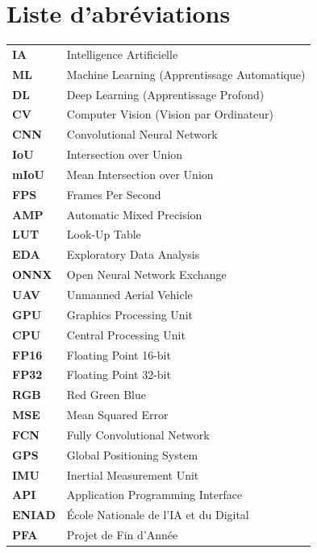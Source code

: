 \renewcommand{\contentsname}{Sommaire}
\tableofcontents
\clearpage

\listoffigures
\clearpage

\listoftables
\clearpage

\chapter*{Liste d'abréviations}
\vspace{0.2em}
\small
\renewcommand{\arraystretch}{1.08}
\begin{tabular}{@{}p{3.5cm}l@{}}
  \textbf{IA}    & Intelligence Artificielle \\
  \textbf{ML}    & Machine Learning (Apprentissage Automatique) \\
  \textbf{DL}    & Deep Learning (Apprentissage Profond) \\
  \textbf{CV}    & Computer Vision (Vision par Ordinateur) \\
  \textbf{CNN}   & Convolutional Neural Network \\
  \textbf{IoU}   & Intersection over Union \\
  \textbf{mIoU}  & Mean Intersection over Union \\
  \textbf{FPS}   & Frames Per Second \\
  \textbf{AMP}   & Automatic Mixed Precision \\
  \textbf{LUT}   & Look-Up Table \\
  \textbf{EDA}   & Exploratory Data Analysis \\
  \textbf{ONNX}  & Open Neural Network Exchange \\
  \textbf{UAV}   & Unmanned Aerial Vehicle \\
  \textbf{GPU}   & Graphics Processing Unit \\
  \textbf{CPU}   & Central Processing Unit \\
  \textbf{FP16}  & Floating Point 16-bit \\
  \textbf{FP32}  & Floating Point 32-bit \\
  \textbf{RGB}   & Red Green Blue \\
  \textbf{MSE}   & Mean Squared Error \\
  \textbf{FCN}   & Fully Convolutional Network \\
  \textbf{GPS}   & Global Positioning System \\
  \textbf{IMU}   & Inertial Measurement Unit \\
  \textbf{API}   & Application Programming Interface \\
  \textbf{ENIAD} & École Nationale de l'IA et du Digital \\
  \textbf{PFA}   & Projet de Fin d'Année \\
\end{tabular}

